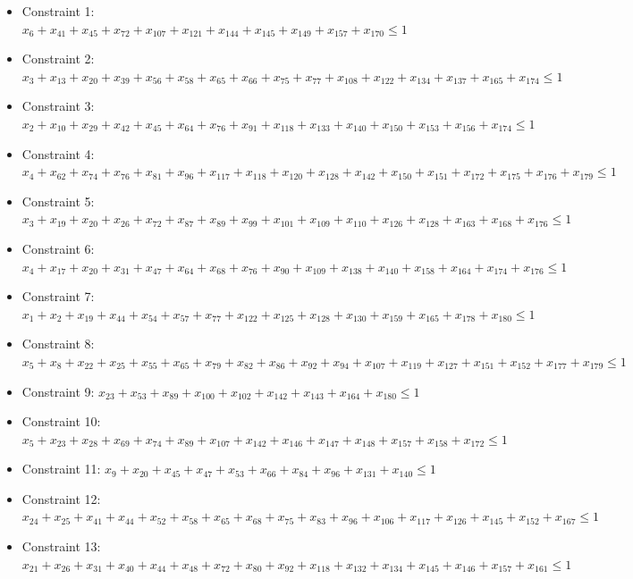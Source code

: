 \documentclass[11pt]{article}
\begin{document}
\begin{itemize}
\item Constraint 1: $x_{6} + x_{41} + x_{45} + x_{72} + x_{107} + x_{121} + x_{144} + x_{145} + x_{149} + x_{157} + x_{170} \le 1$
\item Constraint 2: $x_{3} + x_{13} + x_{20} + x_{39} + x_{56} + x_{58} + x_{65} + x_{66} + x_{75} + x_{77} + x_{108} + x_{122} + x_{134} + x_{137} + x_{165} + x_{174} \le 1$
\item Constraint 3: $x_{2} + x_{10} + x_{29} + x_{42} + x_{45} + x_{64} + x_{76} + x_{91} + x_{118} + x_{133} + x_{140} + x_{150} + x_{153} + x_{156} + x_{174} \le 1$
\item Constraint 4: $x_{4} + x_{62} + x_{74} + x_{76} + x_{81} + x_{96} + x_{117} + x_{118} + x_{120} + x_{128} + x_{142} + x_{150} + x_{151} + x_{172} + x_{175} + x_{176} + x_{179} \le 1$
\item Constraint 5: $x_{3} + x_{19} + x_{20} + x_{26} + x_{72} + x_{87} + x_{89} + x_{99} + x_{101} + x_{109} + x_{110} + x_{126} + x_{128} + x_{163} + x_{168} + x_{176} \le 1$
\item Constraint 6: $x_{4} + x_{17} + x_{20} + x_{31} + x_{47} + x_{64} + x_{68} + x_{76} + x_{90} + x_{109} + x_{138} + x_{140} + x_{158} + x_{164} + x_{174} + x_{176} \le 1$
\item Constraint 7: $x_{1} + x_{2} + x_{19} + x_{44} + x_{54} + x_{57} + x_{77} + x_{122} + x_{125} + x_{128} + x_{130} + x_{159} + x_{165} + x_{178} + x_{180} \le 1$
\item Constraint 8: $x_{5} + x_{8} + x_{22} + x_{25} + x_{55} + x_{65} + x_{79} + x_{82} + x_{86} + x_{92} + x_{94} + x_{107} + x_{119} + x_{127} + x_{151} + x_{152} + x_{177} + x_{179} \le 1$
\item Constraint 9: $x_{23} + x_{53} + x_{89} + x_{100} + x_{102} + x_{142} + x_{143} + x_{164} + x_{180} \le 1$
\item Constraint 10: $x_{5} + x_{23} + x_{28} + x_{69} + x_{74} + x_{89} + x_{107} + x_{142} + x_{146} + x_{147} + x_{148} + x_{157} + x_{158} + x_{172} \le 1$
\item Constraint 11: $x_{9} + x_{20} + x_{45} + x_{47} + x_{53} + x_{66} + x_{84} + x_{96} + x_{131} + x_{140} \le 1$
\item Constraint 12: $x_{24} + x_{25} + x_{41} + x_{44} + x_{52} + x_{58} + x_{65} + x_{68} + x_{75} + x_{83} + x_{96} + x_{106} + x_{117} + x_{126} + x_{145} + x_{152} + x_{167} \le 1$
\item Constraint 13: $x_{21} + x_{26} + x_{31} + x_{40} + x_{44} + x_{48} + x_{72} + x_{80} + x_{92} + x_{118} + x_{132} + x_{134} + x_{145} + x_{146} + x_{157} + x_{161} \le 1$

\end{itemize}
\end{document}
